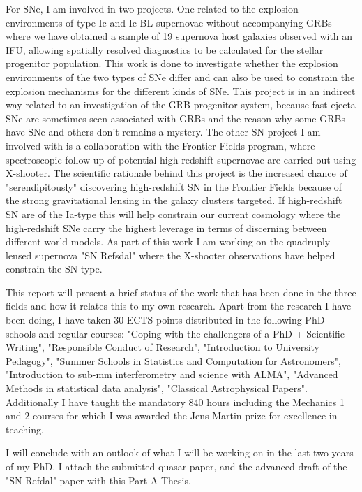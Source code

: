 For SNe, I am involved in two projects. One related to the explosion
environments of type Ic and Ic-BL supernovae without accompanying GRBs where we
have obtained a sample of 19 supernova host galaxies observed with an IFU,
allowing spatially resolved diagnostics to be calculated for the stellar
progenitor population. This work is done to investigate whether the explosion
environments of the
two types of SNe differ and can also be used to constrain
the explosion
mechanisms for the different kinds of SNe. This project is in an
indirect way
related to an investigation of the GRB progenitor system, because
fast-ejecta
SNe are sometimes seen associated with GRBs and the reason why some
GRBs have
SNe and others don't remains a mystery. The other SN-project I am
involved with is a collaboration with the Frontier Fields program, where
spectroscopic follow-up of potential high-redshift supernovae are carried out
using X-shooter. The scientific rationale behind this project is the increased
chance of "serendipitously" discovering high-redshift SN in the Frontier Fields
because of the strong gravitational lensing in the galaxy clusters targeted. If
high-redshift SN are of the Ia-type this will help constrain our current
cosmology where the high-redshift SNe carry the highest leverage in terms of
discerning between different world-models. As part of this work I am working on
the quadruply lensed supernova "SN Refsdal" where the X-shooter observations
have helped constrain the SN type.

This report will present a brief status of the work that has been done in the
three fields and how it relates this to my own research. Apart from the research
I have been doing, I have taken 30 ECTS points distributed in the following
PhD-schools and regular courses: "Coping with the challengers of a PhD +
Scientific Writing", "Responsible Conduct of Research", "Introduction to
University Pedagogy", "Summer Schools in Statistics and Computation for
Astronomers", "Introduction to sub-mm interferometry and science with ALMA",
"Advanced Methods in statistical data analysis", "Classical Astrophysical
Papers". Additionally I have taught the mandatory 840 hours including the
Mechanics 1 and 2
courses for which I was awarded the Jens-Martin prize for
excellence in
teaching.

I will conclude with an outlook of what I will be working on in the last two
years of my PhD. 
I attach the submitted quasar paper, and the advanced draft of
the "SN Refdal"-paper with this Part A Thesis.


